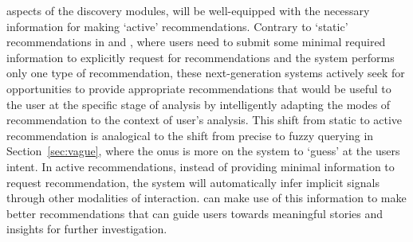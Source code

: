 aspects of the \vidaql discovery modules, 
\vida will be well-equipped with the necessary 
information for making `active' recommendations. 
Contrary to `static' recommendations in \sbd and \seedb, 
where users need to submit some minimal required 
information to explicitly request 
for recommendations and the system 
performs only one type of recommendation, 
these next-generation systems 
actively seek for opportunities to 
provide appropriate recommendations 
that would be useful to the user at the 
specific stage of analysis by intelligently 
adapting the modes of recommendation 
to the context of user's analysis. 
This shift from static to active recommendation is analogical to the shift from precise to fuzzy querying in Section~\ref{sec:vague}, where the onus is more on the system to `guess' at the users intent. 
In active recommendations, instead of providing 
minimal information to request recommendation, 
the system will automatically infer implicit 
signals through other modalities of interaction. 
\vida can make use of this information to 
make better recommendations that can guide users 
towards meaningful stories and insights for further investigation.


